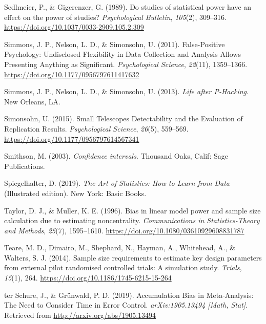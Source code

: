 \documentclass[
  english,
  ,jou, a4paper,floatsintext]{apa6}
\newlength{\cslhangindent}
\newenvironment{cslreferences}%
  {\setlength{\parindent}{0pt}%
  \everypar{\setlength{\hangindent}{\cslhangindent}}\ignorespaces}%
  {\par}
\begin{document}
\begin{cslreferences}
\leavevmode\hypertarget{ref-sedlmeier_studies_1989}{}%
Sedlmeier, P., \& Gigerenzer, G. (1989). Do studies of statistical power have an effect on the power of studies? \emph{Psychological Bulletin}, \emph{105}(2), 309--316. \url{https://doi.org/10.1037/0033-2909.105.2.309}

\leavevmode\hypertarget{ref-simmons_false-positive_2011}{}%
Simmons, J. P., Nelson, L. D., \& Simonsohn, U. (2011). False-Positive Psychology: Undisclosed Flexibility in Data Collection and Analysis Allows Presenting Anything as Significant. \emph{Psychological Science}, \emph{22}(11), 1359--1366. \url{https://doi.org/10.1177/0956797611417632}

\leavevmode\hypertarget{ref-simmons_life_2013}{}%
Simmons, J. P., Nelson, L. D., \& Simonsohn, U. (2013). \emph{Life after P-Hacking}. New Orleans, LA.

\leavevmode\hypertarget{ref-simonsohn_small_2015}{}%
Simonsohn, U. (2015). Small Telescopes Detectability and the Evaluation of Replication Results. \emph{Psychological Science}, \emph{26}(5), 559--569. \url{https://doi.org/10.1177/0956797614567341}

\leavevmode\hypertarget{ref-smithson_confidence_2003}{}%
Smithson, M. (2003). \emph{Confidence intervals}. Thousand Oaks, Calif: Sage Publications.

\leavevmode\hypertarget{ref-spiegelhalter_art_2019}{}%
Spiegelhalter, D. (2019). \emph{The Art of Statistics: How to Learn from Data} (Illustrated edition). New York: Basic Books.

\leavevmode\hypertarget{ref-taylor_bias_1996}{}%
Taylor, D. J., \& Muller, K. E. (1996). Bias in linear model power and sample size calculation due to estimating noncentrality. \emph{Communications in Statistics-Theory and Methods}, \emph{25}(7), 1595--1610. \url{https://doi.org/10.1080/03610929608831787}

\leavevmode\hypertarget{ref-teare_sample_2014}{}%
Teare, M. D., Dimairo, M., Shephard, N., Hayman, A., Whitehead, A., \& Walters, S. J. (2014). Sample size requirements to estimate key design parameters from external pilot randomised controlled trials: A simulation study. \emph{Trials}, \emph{15}(1), 264. \url{https://doi.org/10.1186/1745-6215-15-264}

\leavevmode\hypertarget{ref-ter_schure_accumulation_2019}{}%
ter Schure, J., \& Grünwald, P. D. (2019). Accumulation Bias in Meta-Analysis: The Need to Consider Time in Error Control. \emph{arXiv:1905.13494 {[}Math, Stat{]}}. Retrieved from \url{http://arxiv.org/abs/1905.13494}


\end{cslreferences}
\end{document}
